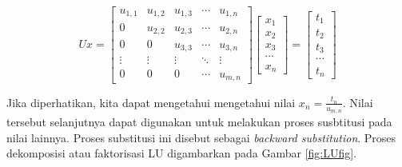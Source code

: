 \documentclass[]{book}
\theoremstyle{definition}
\theoremstyle{definition}
\theoremstyle{definition}
\theoremstyle{remark}
\begin{document}
\begin{equation}
Ux=
\begin{bmatrix}
     u_{1,1} & u_{1,2} & u_{1,3} &\cdots& u_{1,n}           \\[0.3em]
     0       & u_{2,2} & u_{2,3} &\cdots& u_{2,n}           \\[0.3em]
     0       & 0       & u_{3,3} &\cdots& u_{3,n}           \\[0.3em]
     \vdots  & \vdots  & \vdots  &\ddots& \vdots            \\[0.3em]
     0       & 0      & 0        &\cdots& u_{m,n}
     \end{bmatrix}
\begin{bmatrix}
     x_1                                          \\[0.3em]
     x_2                                          \\[0.3em]
     x_3                                          \\[0.3em]
     \cdots                                       \\[0.3em]
     x_n                                       
     \end{bmatrix}
= \begin{bmatrix}
     t_1                                          \\[0.3em]
     t_2                                          \\[0.3em]
     t_3                                          \\[0.3em]
     \cdots                                       \\[0.3em]
     t_n                                       
     \end{bmatrix}
  \label{eq:LUdecomp7}
\end{equation}

Jika diperhatikan, kita dapat mengetahui mengetahui nilai \(x_n=\frac{t_n}{u_{m,n}}\). Nilai tersebut selanjutnya dapat digunakan untuk melakukan proses susbtitusi pada nilai lainnya. Proses substitusi ini disebut sebagai \emph{backward substitution}. Proses dekomposisi atau faktorisasi LU digambarkan pada Gambar \ref{fig:LUfig}.
\end{document}
